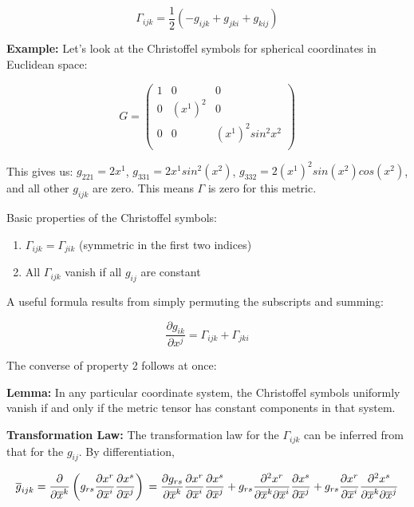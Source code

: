 \documentclass{article}
\begin{document}
\begin{equation}
	\Gamma_{ijk} = \frac{ 1 }{ 2 } \left( -g_{ijk} + g_{jki} + g_{kij} \right)
\end{equation}

\noindent \textbf{Example: }
Let's look at the Christoffel symbols for spherical coordinates in Euclidean space:

\begin{equation*}
	G =
	\begin{pmatrix}
	1 & 0 & 0 \\
	0 & (x^1)^2 & 0 \\
	0 & 0 & (x^1)^2 sin^2 x^2 \\
	\end{pmatrix} 
\end{equation*}

\noindent
This gives us: $g_{221} = 2x^1$, $g_{331} = 2x^1 sin^2( x^2 )$, $g_{332} = 2(x^1)^2 sin( x^2 ) cos( x^2 )$, and all other $g_{ijk}$ are zero.  This means $\Gamma$ is zero for this metric.

\noindent
Basic properties of the Christoffel symbols:

\begin{enumerate}
	\item $\Gamma_{ijk} = \Gamma_{jik}$ (symmetric in the first two indices)
	\item All $\Gamma_{ijk}$ vanish if all $g_{ij}$ are constant
\end{enumerate}

\noindent
A useful formula results from simply permuting the subscripts and summing:

\begin{equation}
	\frac{ \partial g_{ik} }{ \partial x^j } = \Gamma_{ijk} + \Gamma_{jki}
\end{equation}

\noindent
The converse of property 2 follows at once:

\noindent \textbf{Lemma: }
In any particular coordinate system, the Christoffel symbols uniformly vanish if and only if the metric tensor has constant components in that system.


\noindent \textbf{Transformation Law: }
The transformation law for the $\Gamma_{ijk}$ can be inferred from that for the $g_{ij}$.  By differentiation,

\begin{equation*}
	\overline{ g }_{ijk} = \frac{ \partial }{ \partial \overline{ x }^k } \left( g_{rs} \frac{ \partial x^r }{ \partial \overline{ x }^i } \frac{ \partial x^s }{ \partial \overline{ x }^j } \right) \\
	= \frac{ \partial g_{rs} }{ \partial \overline{ x }^k } \frac{ \partial x^r }{ \partial \overline{ x }^i } \frac{ \partial x^s }{ \partial \overline{ x }^j } \\
	+ g_{rs} \frac{ \partial^2 x^r }{ \partial \overline{ x }^k \partial \overline{ x }^i } \frac{ \partial x^s }{ \partial \overline{ x }^j } \\
	+ g_{rs} \frac{ \partial x^r }{ \partial \overline{ x }^i } \frac{ \partial^2 x^s }{ \partial \overline{ x }^k \partial \overline{ x }^j } \\
\end{equation*}
\end{document}
